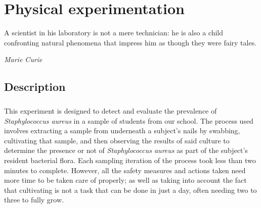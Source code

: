 \chapter{Physical experimentation}
\epigraph{A scientist in his laboratory is not a mere technician: he is also a child confronting natural phenomena that impress him as though they were fairy tales.}{\textit{Marie Curie}}
\section{Description}
\paragraph{}This experiment is designed to detect and evaluate the prevalence of \emph{Staphylococcus aureus} in a sample of students from our school. The process used involves extracting a sample from underneath a subject's nails by swabbing, cultivating that sample, and then observing the results of said culture to determine the presence or not of \emph{Staphylococcus aureus} as part of the subject's resident bacterial flora. Each sampling iteration of the process took less than two minutes to complete. However, all the safety measures and actions taken need more time to be taken care of properly; as well as taking into account the fact that cultivating is not a task that can be done in just a day, often needing two to three to fully grow.
